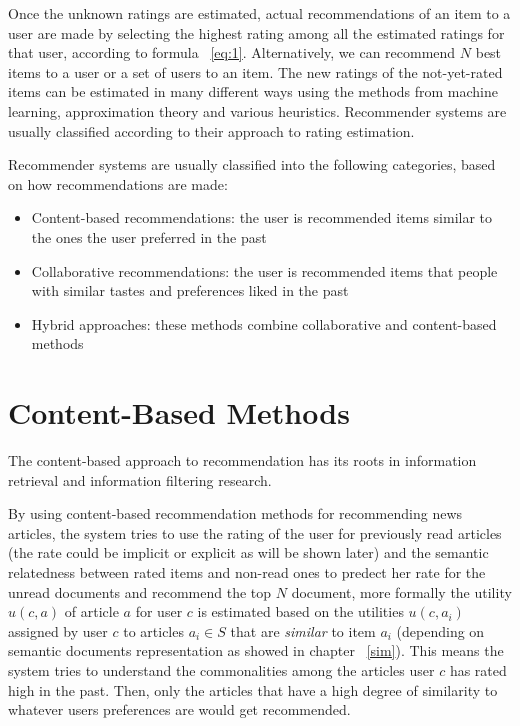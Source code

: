 Once the unknown ratings are estimated, actual recommendations of an item to a user are made by selecting the highest rating among all the estimated ratings for that user, according to formula ~\ref{eq:1}. Alternatively, we can recommend $N$ best items to a user or a set of users to an item.
The new ratings of the not-yet-rated items can be estimated in many different ways using the methods from machine learning, approximation theory and various heuristics. Recommender systems are usually classified according to their approach to rating estimation.

Recommender systems are usually classified into the following categories, based on how recommendations are made:
\begin{itemize}
	\item Content-based recommendations: the user is recommended items similar to the ones the user preferred in the past
	\item Collaborative recommendations: the user is recommended items that people with similar tastes and preferences liked in the past
	\item Hybrid approaches: these methods combine collaborative and content-based methods
\end{itemize}


\section{Content-Based Methods}\label{content}
The content-based approach to recommendation has its roots in information retrieval \citep{recom_7} \citep{recom_89} and information filtering \citep{recom_10} research.

By using content-based recommendation methods for recommending news articles, the system tries to use the rating of the user for previously read articles (the rate could be implicit or explicit as will be shown later) and the semantic relatedness between rated items and non-read ones to predect her rate for the unread documents and recommend the top $N$ document, more formally the utility $u(c, a)$ of article $a$ for user $c$ is estimated based on the utilities $u(c ,a_i)$  assigned by user $c$ to articles $a_i \in S$ that are \textit{similar} to item $a_i$ (depending on semantic documents representation as showed in chapter ~\ref{sim}). This means the system tries to understand the commonalities among the articles user $c$ has rated high in the past. Then, only the articles that have a high degree of similarity to whatever users preferences are would get recommended.

